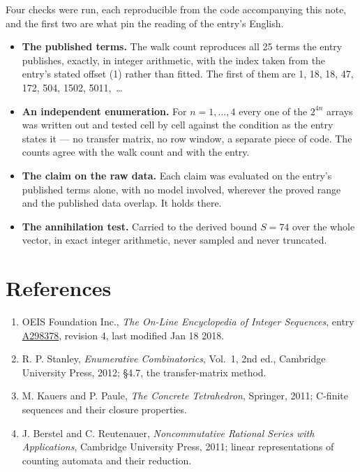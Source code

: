 \documentclass[11pt]{article}
\theoremstyle{definition}
\begin{document}
Four checks were run, each reproducible from the code accompanying this note, and the first two are what pin the reading of the entry's English.

\begin{itemize}

\item {\bfseries The published terms.} The walk count reproduces all 25 terms the entry publishes, exactly, in integer arithmetic, with the index taken from the entry's stated offset (1) rather than fitted. The first of them are 1, 18, 18, 47, 172, 504, 1502, 5011,~\dots

\item {\bfseries An independent enumeration.} For $n = 1,\dots,4$ every one of the $2^{4n}$ arrays was written out and tested cell by cell against the condition as the entry states it --- no transfer matrix, no row window, a separate piece of code. The counts agree with the walk count and with the entry.

\item {\bfseries The claim on the raw data.} Each claim was evaluated on the entry's published terms alone, with no model involved, wherever the proved range and the published data overlap. It holds there.

\item {\bfseries The annihilation test.} Carried to the derived bound $S = 74$ over the whole vector, in exact integer arithmetic, never sampled and never truncated.

\end{itemize}

\section{References}

\begin{enumerate}

\item OEIS Foundation Inc., \emph{The On-Line Encyclopedia of Integer Sequences}, entry \href{https://oeis.org/A298378}{A298378}, revision 4, last modified Jan 18 2018.

\item R. P. Stanley, \emph{Enumerative Combinatorics}, Vol.~1, 2nd ed., Cambridge University Press, 2012; \S4.7, the transfer-matrix method.

\item M. Kauers and P. Paule, \emph{The Concrete Tetrahedron}, Springer, 2011; C-finite sequences and their closure properties.

\item J. Berstel and C. Reutenauer, \emph{Noncommutative Rational Series with Applications}, Cambridge University Press, 2011; linear representations of counting automata and their reduction.

\end{enumerate}
\end{document}
